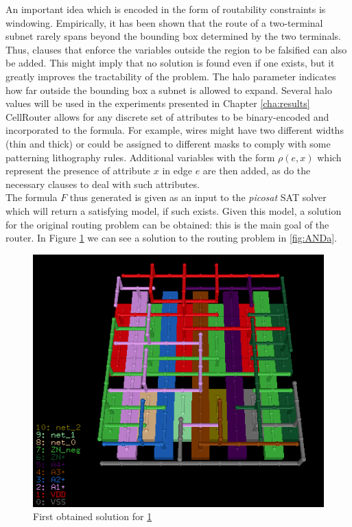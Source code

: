 An important idea which is encoded in the form of routability constraints is windowing. Empirically, it has been shown that the route of a two-terminal subnet rarely spans beyond the bounding box determined by the two terminals. Thus, clauses that enforce the variables outside the region to be falsified can also be added. This might imply that no solution is found even if one exists, but it greatly improves the tractability of the problem. The halo parameter indicates how far outside the bounding box a subnet is allowed to expand. Several halo values will be used in the experiments presented in Chapter \ref{cha:results} \\

CellRouter allows for any discrete set of attributes to be binary-encoded and incorporated to the formula. For example, wires might have two different widths (thin and thick) or could be assigned to different masks to comply with some patterning lithography rules. Additional variables with the form $\rho(e, x)$ which represent the presence of attribute $x$ in edge $e$ are then added, as do the necessary clauses to deal with such attributes. \\

The formula $F$ thus generated is given as an input to the \textit{picosat} SAT solver which will return a satisfying model, if such exists. Given this model, a solution for the original routing problem can be obtained: this is the main goal of the router. In Figure \ref{fig:ANDb} we can see a solution to the routing problem in \ref{fig:ANDa}. \\

\begin{figure}[h!]
  \centering
  \includegraphics[scale=0.6]{img/bckgrnd/ANDb.png}
  \caption{First obtained solution for \ref{fig:ANDb}}
  \label{fig:ANDb}
\end{figure}



